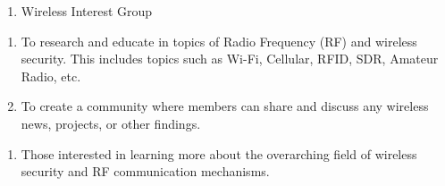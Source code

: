 

\begin{enumerate}
	\item Wireless Interest Group
\end{enumerate}


\begin{enumerate}
	\item To research and educate in topics of Radio Frequency (RF) and wireless
	      security. This includes topics such as Wi-Fi, Cellular, RFID, SDR, Amateur
	      Radio, etc.
	\item To create a community where members can share and discuss any wireless news,
	      projects, or other findings.

\end{enumerate}


\begin{enumerate}
	\item Those interested in learning more about the overarching field of wireless
	      security and RF communication mechanisms.
\end{enumerate}